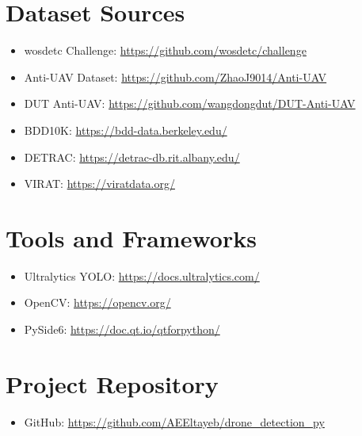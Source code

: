 \documentclass[a4paper,12pt]{report}
\begin{document}
\section{Dataset Sources}
\begin{itemize}
    \item wosdetc Challenge: \url{https://github.com/wosdetc/challenge}
    \item Anti-UAV Dataset: \url{https://github.com/ZhaoJ9014/Anti-UAV}
    \item DUT Anti-UAV: \url{https://github.com/wangdongdut/DUT-Anti-UAV}
    \item BDD10K: \url{https://bdd-data.berkeley.edu/}
    \item DETRAC: \url{https://detrac-db.rit.albany.edu/}
    \item VIRAT: \url{https://viratdata.org/}
\end{itemize}

\section{Tools and Frameworks}
\begin{itemize}
    \item Ultralytics YOLO: \url{https://docs.ultralytics.com/}
    \item OpenCV: \url{https://opencv.org/}
    \item PySide6: \url{https://doc.qt.io/qtforpython/}
\end{itemize}

\section{Project Repository}
\begin{itemize}
    \item GitHub: \url{https://github.com/AEEltayeb/drone_detection_py}
\end{itemize}
\end{document}
